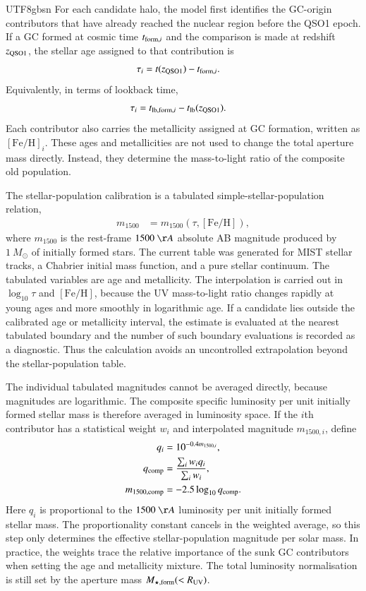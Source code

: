 \documentclass[trackchanges, twocolappendix, twocolumn]{aastex701}
\begin{document}
\begin{CJK*}{UTF8}{gbsn}
For each candidate halo, the model first identifies the GC-origin contributors that have already reached the nuclear region before the QSO1 epoch. If a GC formed at cosmic time $t_{{\rm form},i}$ and the comparison is made at redshift $z_{\rm QSO1}$, the stellar age assigned to that contribution is
\begin{align}
\tau_i &= t(z_{\rm QSO1})-t_{{\rm form},i}.
\end{align}
Equivalently, in terms of lookback time,
\begin{align}
\tau_i &= t_{{\rm lb},{\rm form},i}-t_{\rm lb}(z_{\rm QSO1}).
\end{align}
Each contributor also carries the metallicity assigned at GC formation, written as $[\mathrm{Fe}/\mathrm{H}]_i$. These ages and metallicities are not used to change the total aperture mass directly. Instead, they determine the mass-to-light ratio of the composite old population.

The stellar-population calibration is a tabulated simple-stellar-population relation,
\begin{align}
m_{1500} &= m_{1500}(\tau,[\mathrm{Fe}/\mathrm{H}]),
\end{align}
where $m_{1500}$ is the rest-frame $1500~\AA$ absolute AB magnitude produced by $1~M_\odot$ of initially formed stars. The current table was generated for MIST stellar tracks, a Chabrier initial mass function, and a pure stellar continuum. The tabulated variables are age and metallicity. The interpolation is carried out in $\log_{10}\tau$ and $[\mathrm{Fe}/\mathrm{H}]$, because the UV mass-to-light ratio changes rapidly at young ages and more smoothly in logarithmic age. If a candidate lies outside the calibrated age or metallicity interval, the estimate is evaluated at the nearest tabulated boundary and the number of such boundary evaluations is recorded as a diagnostic. Thus the calculation avoids an uncontrolled extrapolation beyond the stellar-population table.

The individual tabulated magnitudes cannot be averaged directly, because magnitudes are logarithmic. The composite specific luminosity per unit initially formed stellar mass is therefore averaged in luminosity space. If the $i$th contributor has a statistical weight $w_i$ and interpolated magnitude $m_{1500,i}$, define
\begin{align}
q_i &= 10^{-0.4 m_{1500,i}},\\
q_{\rm comp} &=
\dfrac{\sum_i w_i q_i}{\sum_i w_i},\\
m_{1500,{\rm comp}} &=
-2.5\log_{10} q_{\rm comp}.
\end{align}
Here $q_i$ is proportional to the $1500~\AA$ luminosity per unit initially formed stellar mass. The proportionality constant cancels in the weighted average, so this step only determines the effective stellar-population magnitude per solar mass. In practice, the weights trace the relative importance of the sunk GC contributors when setting the age and metallicity mixture. The total luminosity normalisation is still set by the aperture mass $M_{\star,{\rm form}}(<R_{\rm UV})$.


\end{CJK*}
\end{document}
